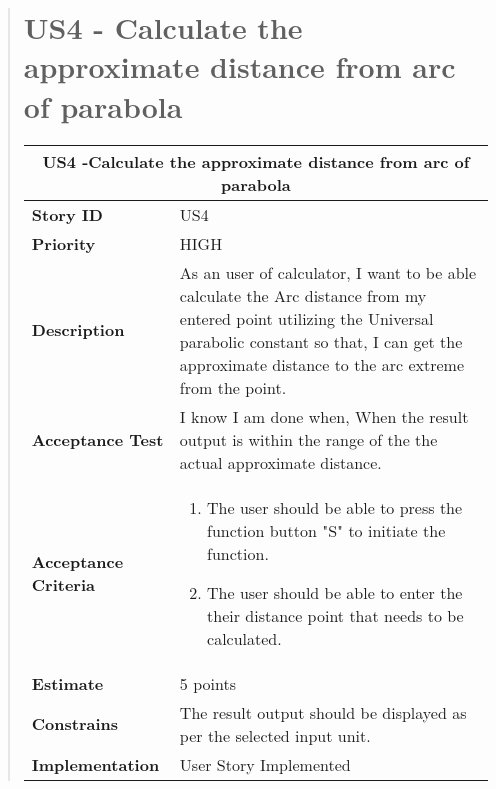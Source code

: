 \documentclass[12pt]{report}
\begin{document}
\begin{quote}
             \section{US4 - Calculate the approximate distance from arc of parabola}
                \begin{tabular}{ |p{4cm}|p{10cm}| }
                 \hline
                 \multicolumn{2}{|c|}{\textbf{US4 -Calculate the approximate distance from arc of parabola} }\\
                 \hline
                 \textbf {Story ID}& US4 \\
                 \hline
                 \textbf{Priority} & HIGH \\
                 \hline
                 \textbf{Description}   & As an user of calculator, I want to be able calculate the Arc distance from my entered point utilizing the Universal parabolic constant so that, I can get the approximate distance to the arc extreme from the point.\\
                 \hline
                 \textbf{Acceptance Test}&I know I am done when, When the result output is within the range of the the actual approximate distance.\\
                 \hline
                 \textbf{Acceptance Criteria}&\begin{enumerate}
                     \item The user should be able to press the function button "S" to initiate the function.
                     \item The user should be able to enter the their distance point that needs to be calculated.
                 \end{enumerate}\\
                 \hline
                 \textbf{Estimate} &  5  points  \\
                 \hline
                 \textbf{Constrains}& The result output should be displayed as per the selected input unit.  \\
                 \hline
                         \textbf {Implementation}&User Story Implemented \\
                \hline
                \end{tabular}
            \hfill\break
            
            
            

\end{quote}
\end{document}
